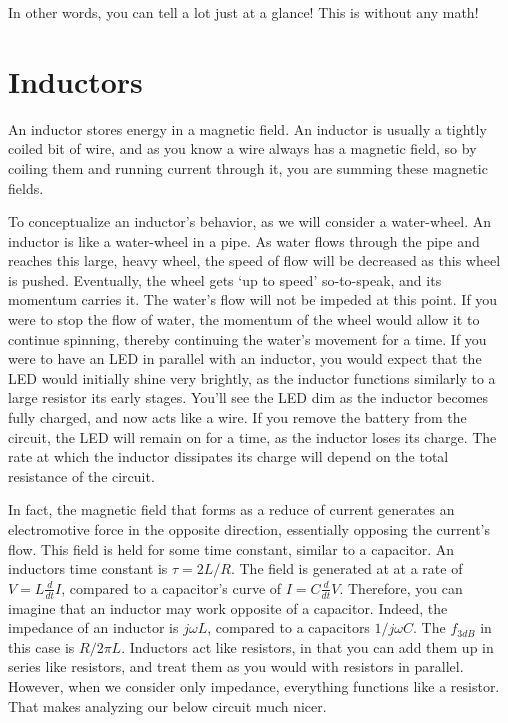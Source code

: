 \documentclass[12pt]{report}
\newcommand{\fdb}{{f}_{3dB}}
\begin{document}
In other words, you can tell a lot just at a glance! This is without any math!

\section{Inductors}
An inductor stores energy in a magnetic field. An inductor is usually a tightly coiled bit of wire, and as you know a wire always has a magnetic field, so by coiling them and running current through it, you are summing these magnetic fields.\newline

To conceptualize an inductor's behavior, as we will consider a water-wheel. An inductor is like a water-wheel in a pipe. As water flows through the pipe and reaches this large, heavy wheel, the speed of flow will be decreased as this wheel is pushed. Eventually, the wheel gets `up to speed' so-to-speak, and its momentum carries it. The water's flow will not be impeded at this point. If you were to stop the flow of water, the momentum of the wheel would allow it to continue spinning, thereby continuing the water's movement for a time. If you were to have an LED in parallel with an inductor, you would expect that the LED would initially shine very brightly, as the inductor functions similarly to a large resistor its early stages. You'll see the LED dim as the inductor becomes fully charged, and now acts like a wire. If you remove the battery from the circuit, the LED will remain on for a time, as the inductor loses its charge. The rate at which the inductor dissipates its charge will depend on the total resistance of the circuit.\newline

In fact, the magnetic field that forms as a reduce of current generates an electromotive force in the opposite direction, essentially opposing the current's flow. This field is held for some time constant, similar to a capacitor. An inductors time constant is $\tau = 2L/R$. The field is generated at at a rate of $V = L\frac{d}{dt}I$, compared to a capacitor's curve of $I = C\frac{d}{dt}V$. Therefore, you can imagine that an inductor may work opposite of a capacitor. Indeed, the impedance of an inductor is $j\omega L$, compared to a capacitors $1/ j\omega C$. The $\fdb$ in this case is $R/2\pi L$. Inductors act like resistors, in that you can add them up in series like resistors, and treat them as you would with resistors in parallel. However, when we consider only impedance, everything functions like a resistor. That makes analyzing our below circuit much nicer. 
\end{document}
